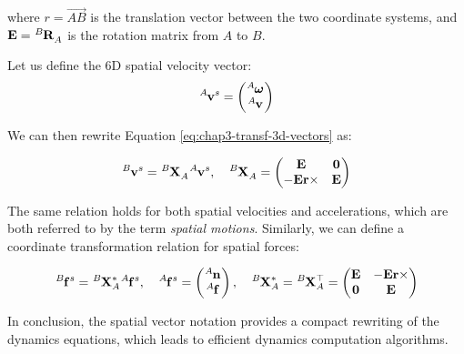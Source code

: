 where $r=\overset{\longrightarrow}{AB}$ is the translation vector
between the two coordinate systems, and $\mathbf{E} =
\tensor*[^B]{\mathbf{R}}{_A}$ is the rotation matrix from $A$ to $B$.

Let us define the 6D spatial velocity vector:
\begin{equation}
  \tensor*[^A]{\mathbf{v}}{^s}=
  \left(\begin{matrix}
    \tensor*[^A]{\boldsymbol{\omega}}{}\\
    \tensor*[^A]{\mathbf{v}}{}
  \end{matrix}\right)
\end{equation}

We can then rewrite Equation \ref{eq:chap3-transf-3d-vectors} as:

\begin{equation}
  \tensor*[^B]{\mathbf{v}}{^s}=
  \tensor*[^B]{\mathbf{X}}{_A}
  \tensor*[^A]{\mathbf{v}}{^s}
  ,\quad
  \tensor*[^B]{\mathbf{X}}{_A}=
    \left(\begin{matrix}
    \mathbf{E} & \mathbf{0} \\
    -\mathbf{E}\mathbf{r}\times & \mathbf{E}
  \end{matrix}\right)
\end{equation}

The same relation holds for both spatial velocities and accelerations,
which are both referred to by the term \emph{spatial motions}.
Similarly, we can define a coordinate transformation relation for
spatial forces:

\begin{equation}
  \tensor*[^B]{\mathbf{f}}{^s}=
  \tensor*[^B]{\mathbf{X}}{^*_A}
  \tensor*[^A]{\mathbf{f}}{^s}
  ,\quad
  \tensor*[^A]{\mathbf{f}}{^s}=
  \left(\begin{matrix}
    \tensor*[^A]{\mathbf{n}}{}\\
    \tensor*[^A]{\mathbf{f}}{}
  \end{matrix}\right)
  ,\quad
  \tensor*[^B]{\mathbf{X}}{^*_A}=\tensor*[^B]{\mathbf{X}}{^\top_A}=
    \left(\begin{matrix}
    \mathbf{E} & -\mathbf{E}\mathbf{r}\times \\
    \mathbf{0} & \mathbf{E}
  \end{matrix}\right)
\end{equation}

In conclusion, the spatial vector notation provides a compact
rewriting of the dynamics equations, which leads to efficient dynamics
computation algorithms.

